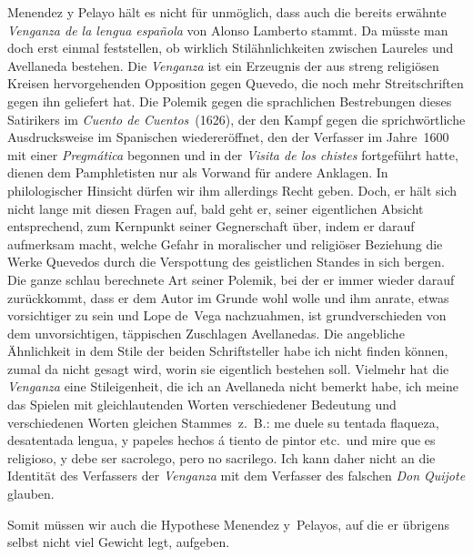 Menendez y Pelayo hält es nicht für unmöglich, dass auch die
bereits erwähnte {\it Venganza de la lengua española} von Alonso Lamberto
stammt. Da müsste man doch erst einmal feststellen, ob wirklich
Stilähnlichkeiten
zwischen Laureles und Avellaneda bestehen. Die {\it Venganza}
ist ein Erzeugnis der aus streng religiösen Kreisen hervorgehenden
Opposition gegen Quevedo, die noch mehr Streitschriften
gegen ihn
geliefert hat. Die Polemik gegen die sprachlichen Bestrebungen dieses
Satirikers im {\it Cuento de Cuentos}~(1626), der den Kampf gegen die
sprichwörtliche Ausdrucksweise im Spanischen wiedereröffnet, den der Verfasser
im Jahre~1600 mit einer {\it Pregmática}
begonnen und in der {\it Visita de los
chistes} fortgeführt hatte, dienen dem Pamphletisten nur als Vorwand für
andere Anklagen. In philologischer Hinsicht dürfen wir ihm allerdings
Recht geben. Doch, er hält sich nicht lange mit diesen Fragen auf, bald
geht er, seiner eigentlichen Absicht entsprechend, zum Kernpunkt seiner
Gegnerschaft über, indem er darauf aufmerksam macht, welche Gefahr
in moralischer
und religiöser Beziehung die Werke Quevedos durch
die Verspottung des geistlichen Standes
in sich bergen. Die ganze
schlau berechnete Art seiner Polemik, bei der er immer wieder darauf
zurückkommt, dass er dem Autor im Grunde wohl wolle und ihm anrate,
etwas vorsichtiger zu sein und Lope de~Vega nachzuahmen, ist grundverschieden
von dem unvorsichtigen, täppischen Zuschlagen Avellanedas.
Die angebliche Ähnlichkeit in dem Stile der beiden Schriftsteller habe
ich nicht finden können, zumal da nicht gesagt wird, worin sie eigentlich
bestehen soll. Vielmehr hat die {\it Venganza} eine Stileigenheit, die ich an
Avellaneda nicht bemerkt habe, ich meine das Spielen mit gleichlautenden
Worten verschiedener Bedeutung und verschiedenen Worten gleichen
Stammes~z.~B.: {\itquoted me duele su tentada flaqueza, desatentada lengua, y
papeles hechos á tiento de pintor} etc.~und {\itquoted mire que es religioso, y debe
ser sacrolego, pero no sacrilego}. Ich kann daher nicht an die Identität
des Verfassers der {\it Venganza} mit dem Verfasser des falschen {\it Don Quijote}
glauben.

Somit müssen wir auch die Hypothese Menendez y~Pelayos, auf
die er übrigens selbst nicht viel Gewicht legt, aufgeben.

